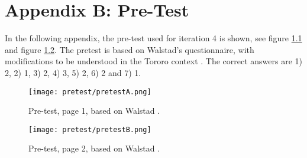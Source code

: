 \chapter{Appendix B: Pre-Test}\label{cha:pre-test}

In the following appendix, the pre-test used for iteration 4 is shown, see figure \ref{fig:pretest1} and figure \ref{fig:pretest2}. The pretest is based on Walstad's questionnaire, with modifications to be understood in the Tororo context \cite{general-entrepreneurship-quiz}. The correct answers are 1) 2, 2) 1, 3) 2, 4) 3, 5) 2, 6) 2 and 7) 1.

\begin{figure}[h]
    \centering
    \texttt{[image: pretest/pretestA.png]}
    \caption{Pre-test, page 1, based on Walstad \cite{general-entrepreneurship-quiz}.}
    \label{fig:pretest1}
\end{figure}

\begin{figure}[h]
    \centering
    \texttt{[image: pretest/pretestB.png]}
    \caption{Pre-test, page 2, based on Walstad \cite{general-entrepreneurship-quiz}.}
    \label{fig:pretest2}
\end{figure}
